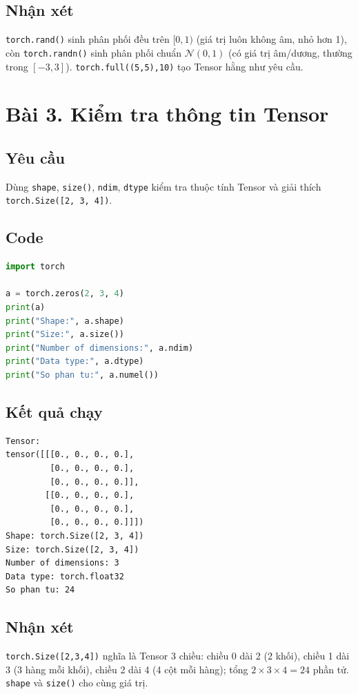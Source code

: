 \documentclass[a4paper,13pt]{article}
\begin{document}
\subsection{Nhận xét}
\texttt{torch.rand()} sinh phân phối đều trên $[0,1)$ (giá trị luôn không âm, nhỏ hơn 1), còn \texttt{torch.randn()} sinh phân phối chuẩn $\mathcal{N}(0,1)$ (có giá trị âm/dương, thường trong $[-3,3]$). \texttt{torch.full((5,5),10)} tạo Tensor hằng như yêu cầu.

\newpage
\section{Bài 3. Kiểm tra thông tin Tensor}

\subsection{Yêu cầu}
Dùng \texttt{shape}, \texttt{size()}, \texttt{ndim}, \texttt{dtype} kiểm tra thuộc tính Tensor và giải thích \texttt{torch.Size([2, 3, 4])}.

\subsection{Code}
\begin{lstlisting}[language=Python]
import torch

a = torch.zeros(2, 3, 4)
print(a)
print("Shape:", a.shape)
print("Size:", a.size())
print("Number of dimensions:", a.ndim)
print("Data type:", a.dtype)
print("So phan tu:", a.numel())
\end{lstlisting}

\subsection{Kết quả chạy}
\begin{lstlisting}[backgroundcolor=\color{outgray}]
Tensor:
tensor([[[0., 0., 0., 0.],
         [0., 0., 0., 0.],
         [0., 0., 0., 0.]],
        [[0., 0., 0., 0.],
         [0., 0., 0., 0.],
         [0., 0., 0., 0.]]])
Shape: torch.Size([2, 3, 4])
Size: torch.Size([2, 3, 4])
Number of dimensions: 3
Data type: torch.float32
So phan tu: 24
\end{lstlisting}

\subsection{Nhận xét}
\texttt{torch.Size([2,3,4])} nghĩa là Tensor 3 chiều: chiều 0 dài 2 (2 khối), chiều 1 dài 3 (3 hàng mỗi khối), chiều 2 dài 4 (4 cột mỗi hàng); tổng $2 \times 3 \times 4 = 24$ phần tử. \texttt{shape} và \texttt{size()} cho cùng giá trị.
\end{document}
